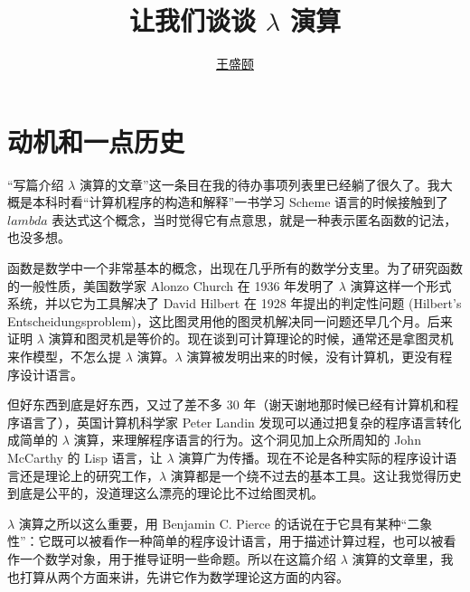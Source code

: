 \documentclass[a4paper,adobefonts]{ctexart}
\begin{document}
\title{{\bfseries 让我们谈谈 $\lambda$ 演算}}
\author{\href{mailto:txyyss@gmail.com}{王盛颐}}
\date{}
\maketitle

\section{动机和一点历史}

``写篇介绍 $\lambda$ 演算的文章''这一条目在我的待办事项列表里已经躺了很久了。我大概是本科时看``计算机程序的构造和解释''一书学习 Scheme 语言的时候接触到了 $lambda$ 表达式这个概念，当时觉得它有点意思，就是一种表示匿名函数的记法，也没多想。

函数是数学中一个非常基本的概念，出现在几乎所有的数学分支里。为了研究函数的一般性质，美国数学家 Alonzo Church 在 1936 年发明了 $\lambda$ 演算这样一个形式系统，并以它为工具解决了 David Hilbert 在 1928 年提出的判定性问题 (Hilbert's Entscheidungsproblem)，这比图灵用他的图灵机解决同一问题还早几个月。后来证明 $\lambda$ 演算和图灵机是等价的。现在谈到可计算理论的时候，通常还是拿图灵机来作模型，不怎么提 $\lambda$ 演算。$\lambda$ 演算被发明出来的时候，没有计算机，更没有程序设计语言。

但好东西到底是好东西，又过了差不多 30 年（谢天谢地那时候已经有计算机和程序语言了），英国计算机科学家 Peter Landin 发现可以通过把复杂的程序语言转化成简单的 $\lambda$ 演算，来理解程序语言的行为。这个洞见加上众所周知的 John McCarthy 的 Lisp 语言，让 $\lambda$ 演算广为传播。现在不论是各种实际的程序设计语言还是理论上的研究工作，$\lambda$ 演算都是一个绕不过去的基本工具。这让我觉得历史到底是公平的，没道理这么漂亮的理论比不过给图灵机。

$\lambda$ 演算之所以这么重要，用 Benjamin C. Pierce 的话说在于它具有某种``二象性''：它既可以被看作一种简单的程序设计语言，用于描述计算过程，也可以被看作一个数学对象，用于推导证明一些命题。所以在这篇介绍 $\lambda$ 演算的文章里，我也打算从两个方面来讲，先讲它作为数学理论这方面的内容。

\end{document}
